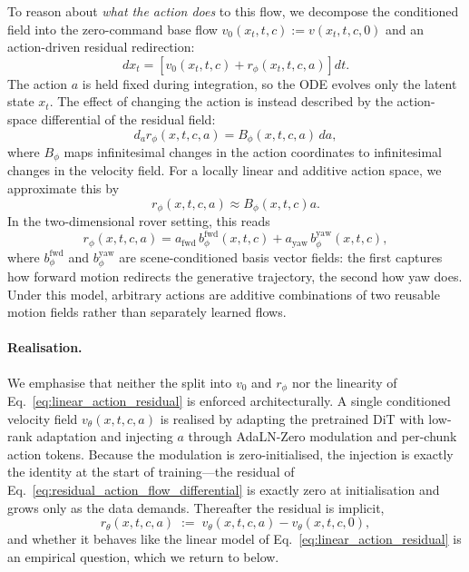 \documentclass[letterpaper]{article} %
\begin{document}
To reason about \emph{what the action does} to this flow, we decompose the conditioned field into the zero-command base flow $v_0(x_t,t,c) := v(x_t,t,c,0)$ and an action-driven residual redirection:
\begin{equation}
    d x_t
    =
    \left[
        v_0(x_t,t,c)
        +
        r_\phi(x_t,t,c,a)
    \right]dt.
    \label{eq:residual_action_flow_differential}
\end{equation}
The action $a$ is held fixed during integration, so the ODE evolves only the latent state $x_t$. The effect of changing the action is instead described by the action-space differential of the residual field:
\begin{equation}
    d_a r_\phi(x,t,c,a)
    =
    B_\phi(x,t,c,a)\,da,
    \label{eq:action_differential_residual}
\end{equation}
where $B_\phi$ maps infinitesimal changes in the action coordinates to infinitesimal changes in the velocity field. For a locally linear and additive action space, we approximate this by
\begin{equation}
    r_\phi(x,t,c,a)
    \approx
    B_\phi(x,t,c)a.
    \label{eq:linear_action_redirection}
\end{equation}
In the two-dimensional rover setting, this reads
\begin{equation}
    r_\phi(x,t,c,a)
    =
    a_{\mathrm{fwd}}\, b^{\mathrm{fwd}}_\phi(x,t,c)
    +
    a_{\mathrm{yaw}}\, b^{\mathrm{yaw}}_\phi(x,t,c),
    \label{eq:linear_action_residual}
\end{equation}
where $b^{\mathrm{fwd}}_\phi$ and $b^{\mathrm{yaw}}_\phi$ are scene-conditioned basis vector fields: the first captures how forward motion redirects the generative trajectory, the second how yaw does. Under this model, arbitrary actions are additive combinations of two reusable motion fields rather than separately learned flows.

\paragraph{Realisation.} We emphasise that neither the split into $v_0$ and $r_\phi$ nor the linearity of Eq.~\eqref{eq:linear_action_residual} is enforced architecturally. A single conditioned velocity field $v_\theta(x,t,c,a)$ is realised by adapting the pretrained DiT with low-rank adaptation and injecting $a$ through AdaLN-Zero modulation and per-chunk action tokens. Because the modulation is zero-initialised, the injection is exactly the identity at the start of training---the residual of Eq.~\eqref{eq:residual_action_flow_differential} is exactly zero at initialisation and grows only as the data demands. Thereafter the residual is implicit,
\begin{equation}
    r_\theta(x,t,c,a) \;:=\; v_\theta(x,t,c,a) - v_\theta(x,t,c,0),
    \label{eq:implicit_residual}
\end{equation}
and whether it behaves like the linear model of Eq.~\eqref{eq:linear_action_residual} is an empirical question, which we return to below.
\end{document}
